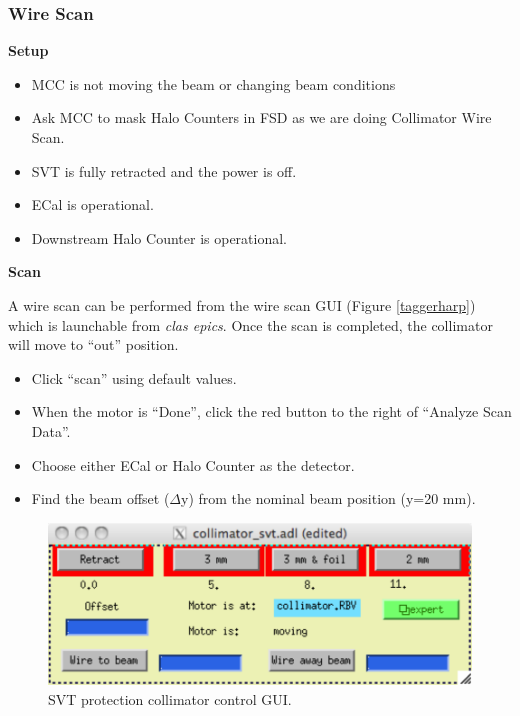\documentclass[12pt]{article}
\begin{document}
\subsubsection{\bf Wire Scan}

\noindent
{\bf Setup}

\begin{itemize}
\item
MCC is not moving the beam or changing beam conditions
\item
Ask MCC to mask Halo Counters in FSD as we are doing Collimator Wire Scan.
\item
SVT is fully retracted and the power is off.
\item
ECal is operational.
\item
Downstream Halo Counter is operational.
\end{itemize}

\noindent
{\bf Scan}

A wire scan can be performed from the wire scan GUI (Figure \ref{taggerharp}) which is launchable from {\it clas epics}. Once the scan is completed, the collimator will move to ``out'' position.

\begin{itemize}
\item
Click ``scan'' using default values.
\item
When the motor is ``Done'', click the red button to the right of ``Analyze Scan Data''.
\item
Choose either ECal or Halo Counter as the detector. 
\item
Find the beam offset ($\Delta$y) from the nominal beam position (y=20 mm).
\end{itemize}

\begin{figure}[ht!]
\centering
\includegraphics[width=12cm]{svt_collimator_GUI.pdf}
\caption{SVT protection collimator control GUI.}
\label{svtcollimator}
\end{figure}
\end{document}
